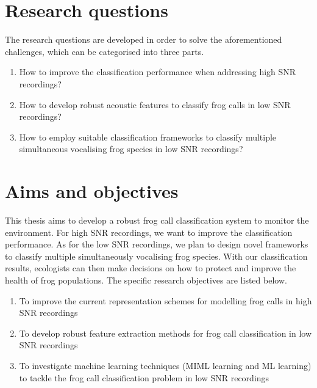 \section{Research questions}
The research questions are developed in order to solve the aforementioned challenges, which can be categorised into three parts. 

\begin{enumerate}
 \item How to improve the classification performance when addressing high SNR recordings?
 
\item How to develop robust acoustic features to classify frog calls in low SNR recordings?

\item How to employ suitable classification frameworks to classify multiple simultaneous vocalising frog species in low SNR recordings?
 
\end{enumerate}




\section{Aims and objectives}
This thesis aims to develop a robust frog call classification system to monitor the environment. For high SNR recordings, we want to improve the classification performance. As for the low SNR recordings, we plan to design novel frameworks to classify multiple simultaneously vocalising frog species. With our classification results, ecologists can then make decisions on how to protect and improve the health of frog populations. The specific research objectives are listed below.


\begin{enumerate}

\item	To improve the current representation schemes for modelling frog calls in high SNR recordings

\item 	To develop robust feature extraction methods for frog call classification in low SNR recordings 

\item   To investigate machine learning techniques (MIML learning and ML learning) to tackle the frog call classification problem in low SNR recordings

\end{enumerate}
 
